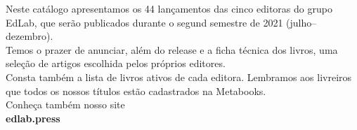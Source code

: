 \hspace*{-.5cm}\parbox{180pt}{\raggedright 
Neste catálogo apresentamos os 44 lançamentos das cinco editoras do grupo EdLab, que serão publicados durante o segund semestre de 2021 (julho--dezembro).\\
\smallskip
Temos o prazer de anunciar, além do release e a ficha técnica dos livros, uma seleção de artigos escolhida pelos próprios editores.\\
\smallskip
Consta também a lista de livros ativos de cada editora. Lembramos aos livreiros que todos os nossos títulos estão cadastrados na Metabooks.\\
\bigskip
Conheça também nosso site\\
\textbf{edlab.press}
}

\pagebreak

\pagestyle{grid}
